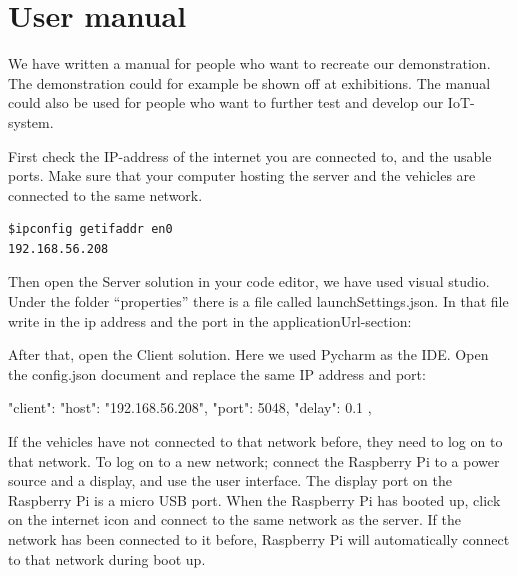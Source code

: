 \chapter{User manual}\label{sec:user_manual}
We have written a manual for people who want to recreate our demonstration. The demonstration could for example be shown off at exhibitions. The manual could also be used for people who want to further test and develop our IoT-system.

First check the IP-address of the internet you are connected to, and the usable ports. Make sure that your computer hosting the server and the vehicles are connected to the same network.

\begin{lstlisting}
$ipconfig getifaddr en0
192.168.56.208
\end{lstlisting}

Then open the Server solution in your code editor, we have used visual studio. Under the folder “properties” there is a file called launchSettings.json. In that file write in the ip address and the port in the applicationUrl-section:

\begin{json}
"profiles": {
	"SignalRServer": {
		"commandName": "Project",
		"dotnetRunMessages": true,
		"launchBrowser": false,
		"applicationUrl": "https://192.168.56.208:7058;http://192.168.56.208:5048",
		"environmentVariables": {
			"ASPNETCORE_ENVIRONMENT": "Development"
		}
	},
\end{json}
	
After that, open the Client solution. Here we used Pycharm as the IDE. Open the config.json document and replace the same IP address and port:
	
\begin{json}
"client": {
	"host": "192.168.56.208",
	"port": 5048,
	"delay": 0.1
},
\end{json}
	
	If the vehicles have not connected to that network before, they need to log on to that network. To log on to a new network; connect the Raspberry Pi to a power source and a display, and use the user interface. The display port on the Raspberry Pi is a micro USB port. When the Raspberry Pi has booted up, click on the internet icon and connect to the same network as the server. If the network has been connected to it before, Raspberry Pi will automatically connect to that network during boot up.
	
